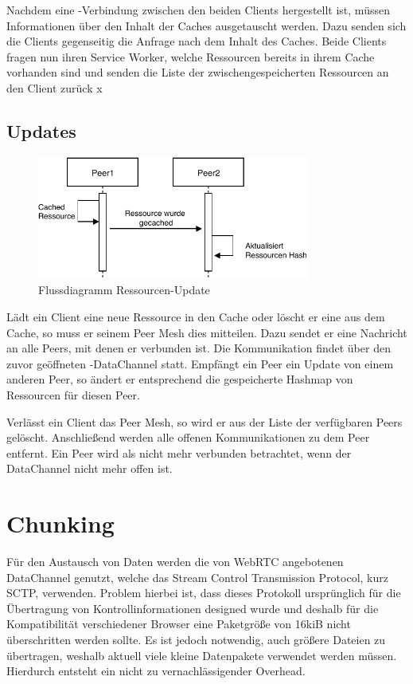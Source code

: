 \begin{description}
Nachdem eine \webrtc-Verbindung zwischen den beiden Clients hergestellt ist, müssen Informationen über den Inhalt der Caches ausgetauscht werden. Dazu senden sich die Clients gegenseitig die Anfrage nach dem Inhalt des Caches. Beide Clients fragen nun ihren Service Worker, welche Ressourcen bereits in ihrem Cache vorhanden sind und senden die Liste der zwischengespeicherten Ressourcen an den Client zurück
x
\subsection{Updates}

\begin{figure}[!h]
	\centering
	\includegraphics[width=0.8\textwidth]{figures/Ressourcen_update}
	\caption[A Figure Short-Title]{Flussdiagramm Ressourcen-Update}
	\label{fig:update_resource}
\end{figure}

Lädt ein Client eine neue Ressource in den Cache oder löscht er eine aus dem Cache, so muss er seinem Peer Mesh dies mitteilen. Dazu sendet er eine Nachricht an alle Peers, mit denen er verbunden ist. Die Kommunikation findet über den zuvor geöffneten \webrtc-DataChannel statt. Empfängt ein Peer ein Update von einem anderen Peer, so ändert er entsprechend die gespeicherte Hashmap von Ressourcen für diesen Peer.

Verlässt ein Client das Peer Mesh, so wird er aus der Liste der verfügbaren Peers gelöscht. Anschließend werden alle offenen Kommunikationen zu dem Peer entfernt. Ein Peer wird als nicht mehr verbunden betrachtet, wenn der DataChannel nicht mehr offen ist.


\section{Chunking} \label{i:chunking}
Für den Austausch von Daten werden die von WebRTC angebotenen DataChannel genutzt, welche das Stream Control Transmission Protocol, kurz SCTP, verwenden. Problem hierbei ist, dass dieses Protokoll ursprünglich für die Übertragung von Kontrollinformationen designed wurde und deshalb für die Kompatibilität verschiedener Browser eine Paketgröße von 16kiB nicht überschritten werden sollte. Es ist jedoch notwendig, auch größere Dateien zu übertragen, weshalb aktuell viele kleine Datenpakete verwendet werden müssen. Hierdurch entsteht ein nicht zu vernachlässigender Overhead.


\end{description}
